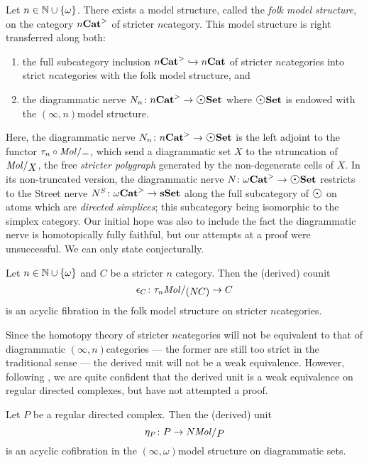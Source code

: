 \begin{thm*}
    Let \( n \in \mathbb{N} \cup \left\{ {\omega} \right\} \).
    There exists a model structure, called the \emph{folk model structure}, on the category \( {n\mathbf{Cat}}^> \) of stricter \( n \)\nbd category.
    This model structure is right transferred along both:
    \begin{enumerate}
        \item the full subcategory inclusion \( {n\mathbf{Cat}}^> \hookrightarrow {n\mathbf{Cat}} \) of stricter \( n \)\nbd categories into strict \( n \)\nbd categories with the folk model structure, and
        \item the diagrammatic nerve \( \N{n} \colon \snCat{n} \to \dgmSet \) where \( \dgmSet \) is endowed with the \( (\infty, n) \)\nbd model structure. 
    \end{enumerate}
\end{thm*}
\noindent Here, the diagrammatic nerve \( \N{n} \colon \snCat{n} \to \dgmSet \) is the left adjoint to the functor \( \trunc{n} \after \molecin{-} \), which send a diagrammatic set \( X \) to the \( n \)\nbd truncation of \( \molecin{X} \), the free \emph{stricter polygraph} generated by the non-degenerate cells of \( X \).
In its non-truncated version, the diagrammatic nerve \( \N{} \colon \somegaCat \to \dgmSet \) restricts to the Street nerve \cite{street1987oriental} \( N^S \colon {\omega\mathbf{Cat}}^> \to \mathbf{sSet} \) along the full subcategory of \( \atom \) on atoms which are \emph{directed simplices}; this subcategory being isomorphic to the simplex category.
Our initial hope was also to include the fact the diagrammatic nerve is homotopically fully faithful, but our attempts at a proof were unsuccessful.
We can only state conjecturally.
\begin{conj*}
    Let \( n \in \mathbb{N} \cup \left\{ {\omega} \right\} \) and \( C \) be a stricter \( n \) \nbd category. 
    Then the (derived) counit
    \begin{equation*}
        \counit_C \colon \trunc{n} \molecin{(\N{}C)} \to C
    \end{equation*}
    is an acyclic fibration in the folk model structure on stricter \( n \)\nbd categories.
\end{conj*}

\noindent Since the homotopy theory of stricter \( n \)\nbd categories will not be equivalent to that of diagrammatic \( (\infty, n) \)\nbd categories --- the former are still too strict in the traditional sense --- the derived unit will not be a weak equivalence.
However, following \cite{gagna2023nerve, maehara2023oriental}, we are quite confident that the derived unit is a weak equivalence on regular directed complexes, but have not attempted a proof.
\begin{conj*}
    Let \( P \) be a regular directed complex.
    Then the (derived) unit 
    \begin{equation*}
        \unit_P \colon P \to \N{}\molecin{P}
    \end{equation*}
    is an acyclic cofibration in the \( (\infty, \omega) \)\nbd model structure on diagrammatic sets. 
\end{conj*}

